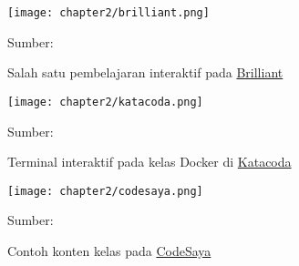 
\begin{figure}[!h]
  \centering
  \texttt{[image: chapter2/brilliant.png]}
  \caption{\label{fig:brilliant}Salah satu pembelajaran interaktif pada \href{https://brilliant.org}{Brilliant}}
  Sumber: \textcite{brilliant2021media}
\end{figure}


\begin{figure}[!h]
  \centering
  \texttt{[image: chapter2/katacoda.png]}
  \caption{\label{fig:katacoda}Terminal interaktif pada kelas Docker di \href{https://www.katacoda.com/}{Katacoda}}
  Sumber: \textcite{katacoda2021media}
\end{figure}

\begin{figure}[!h]
  \centering
  \texttt{[image: chapter2/codesaya.png]}
  \caption{\label{fig:codesaya}Contoh konten kelas pada \href{https://www.codesaya.com/}{CodeSaya}}
  Sumber: \textcite{codesaya2021media}
\end{figure}

